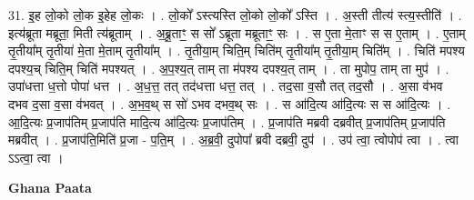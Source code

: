 \documentclass[17pt]{extarticle}
\begin{document}
31. इ॒ह लो॒को लो॒क इ॒हेह लो॒कः । . लो॒को᳚ ऽस्त्यस्ति लो॒को लो॒को᳚ ऽस्ति । . अ॒स्ती तीत्य॑ स्त्य॒स्तीति॑ । . इत्य॑ब्रूता मब्रूता॒ मिती त्य॑ब्रूताम् । . अ॒ब्रू॒ताꣳ॒॒ स सो᳚ ऽब्रूता मब्रूताꣳ॒॒ सः । . स ए॒ता मे॒ताꣳ स स ए॒ताम् । . ए॒ताम् तृ॒तीया᳚म् तृ॒तीया॑ मे॒ता मे॒ताम् तृ॒तीया᳚म् । . तृ॒तीया॒म् चिति॒म् चिति॑म् तृ॒तीया᳚म् तृ॒तीया॒म् चिति᳚म् । . चिति॑ मपश्य दपश्य॒च् चिति॒म् चिति॑ मपश्यत् । . अ॒प॒श्य॒त् ताम् ता म॑पश्य दपश्य॒त् ताम् । . ता मुपोप॒ ताम् ता मुप॑ । . उपा॑धत्ता ध॒त्तो पोपा॑ धत्त । . अ॒ध॒त्त॒ तत् तद॑धत्ता धत्त॒ तत् । . तद॒सा व॒सौ तत् तद॒सौ । . अ॒सा व॑भव दभव द॒सा व॒सा व॑भवत् । . अ॒भ॒व॒थ् स सो॑ ऽभव दभव॒थ् सः । . स आ॑दि॒त्य आ॑दि॒त्यः स स आ॑दि॒त्यः । . आ॒दि॒त्यः प्र॒जाप॑तिम् प्र॒जाप॑ति मादि॒त्य आ॑दि॒त्यः प्र॒जाप॑तिम् । . प्र॒जाप॑ति मब्रवी दब्रवीत् प्र॒जाप॑तिम् प्र॒जाप॑ति मब्रवीत् । . प्र॒जाप॑ति॒मिति॑ प्र॒जा - प॒ति॒म् । . अ॒ब्र॒वी॒ दुपोपा᳚ ब्रवी दब्रवी॒ दुप॑ । . उप॑ त्वा॒ त्वोपोप॑ त्वा । . त्वा ऽऽत्वा॒ त्वा । \newline

\textbf{Ghana Paata } \newline
\end{document}
